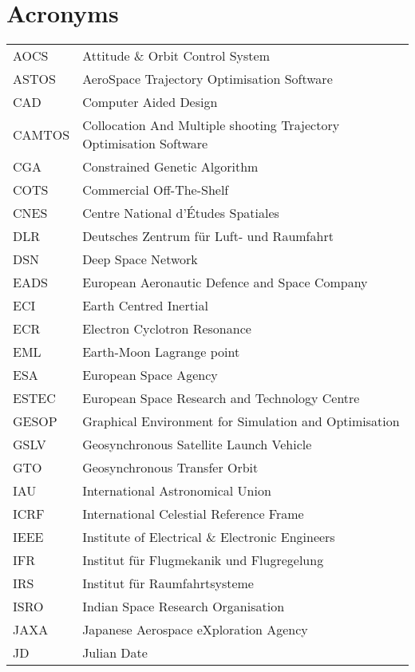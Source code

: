 \begin{longtable}{l p{}}
\end{longtable}

\section*{Acronyms}

\begin{longtable}{l p{}}

AOCS & Attitude \& Orbit Control System \\
ASTOS & AeroSpace Trajectory Optimisation Software \\
CAD & Computer Aided Design \\
CAMTOS & Collocation And Multiple shooting Trajectory Optimisation Software \\
CGA & Constrained Genetic Algorithm \\
COTS & Commercial Off-The-Shelf \\
CNES & Centre National d'\'{E}tudes Spatiales \\
DLR & Deutsches Zentrum f\"{u}r Luft- und Raumfahrt \\
DSN & Deep Space Network \\
EADS & European Aeronautic Defence and Space Company \\
ECI & Earth Centred Inertial \\
ECR & Electron Cyclotron Resonance \\
EML & Earth-Moon Lagrange point \\
ESA & European Space Agency \\
ESTEC &  European Space Research and Technology Centre \\
GESOP & Graphical Environment for Simulation and Optimisation \\
GSLV & Geosynchronous Satellite Launch Vehicle \\
GTO & Geosynchronous Transfer Orbit \\
IAU & International Astronomical Union \\
ICRF & International Celestial Reference Frame \\
IEEE & Institute of Electrical \& Electronic Engineers \\
IFR & Institut f\"{u}r Flugmekanik und Flugregelung \\
IRS & Institut f\"{u}r Raumfahrtsysteme \\
ISRO & Indian Space Research Organisation \\
JAXA & Japanese Aerospace eXploration Agency \\
JD & Julian Date \\

\end{longtable}
